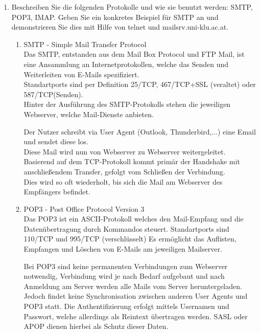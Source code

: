 \documentclass[11pt]{article}
\begin{document}
\begin{enumerate}[\thesection .1]
    \item Beschreiben Sie die folgenden Protokolle und wie sie benutzt werden: SMTP,
POP3, IMAP. Geben Sie ein konkretes Beispiel für SMTP an und demonstrieren
Sie dies mit Hilfe von telnet und mailsrv.uni-klu.ac.at.
    \begin{enumerate}[$\diamond$]
        \item SMTP - Simple Mail Transfer Protocol\\
        Das SMTP, entstanden aus dem Mail Box Protocol und FTP Mail, ist eine Ansammlung an Internetprotokollen, welche das Senden und Weiterleiten von E-Mails spezifiziert.\\
        Standartports sind per Definition 25/TCP, 467/TCP+SSL (veraltet) oder 587/TCP(Senden).\\

        Hinter der Ausführung des SMTP-Protokolls stehen die jeweiligen Webserver, welche Mail-Dienste anbieten.
        \begin{addmargin}[1em]{1em}
            Der Nutzer schreibt via User Agent (Outlook, Thunderbird,...) eine Email und sendet diese los.\\
            Diese Mail wird nun von Webserver zu Webserver weitergeleitet.
            Basierend auf dem TCP-Protokoll kommt primär der Handshake mit anschließendem Transfer, gefolgt vom Schließen der Verbindung.\\
            Dies wird so oft wiederholt, bis sich die Mail am Webserver des Empfängers befindet.
        \end{addmargin}

        \item POP3 - Post Office Protocol Version 3\\
        Das POP3 ist ein ASCII-Protokoll welches den Mail-Empfang und die Datenübertragung durch Kommandos steuert.
        Standartports sind 110/TCP und 995/TCP (verschlüsselt)
        Es ermöglicht das Auflisten, Empfangen und Löschen von E-Mails am jeweiligen Mailserver.

        Bei POP3 sind keine permanenten Verbindungen zum Webserver notwendig, Verbindung wird je nach Bedarf aufgebaut und nach Anmeldung am Server werden
        alle Mails vom Server heruntergeladen. Jedoch findet keine Synchronisation zwischen anderen User Agents und POP3 statt.
        Die Authentifizierung erfolgt mittels Usernamen und Passwort, welche allerdings als Reintext übertragen werden.
        SASL oder APOP dienen hierbei als Schutz dieser Daten.


\end{enumerate}
\end{enumerate}
\end{document}
